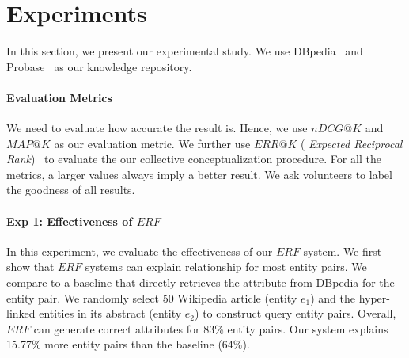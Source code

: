 
\section{Experiments}
\label{sec:exp}

In this section, we present our experimental study.
We use DBpedia~\cite{dbpedia} and Probase~\cite{wu2012probase} as our knowledge repository.
\
\vspace{-4mm}
\paragraph*{Evaluation Metrics}
We need to evaluate how accurate the result is. 
Hence, we use $nDCG@K$ and $MAP@K$ as our evaluation metric.
We further use $ ERR@K$ ( {\it Expected Reciprocal Rank})~\cite{chapelle2009expected} to evaluate the our collective conceptualization procedure.
For all the metrics, a larger values always imply a better result. We ask volunteers to label the goodness of all results.

\vspace{-4mm}
\paragraph*{Exp 1: Effectiveness of $ERF$}
In this experiment, we evaluate the effectiveness of our $ERF$ system.
We first show that $ERF$ systems can explain relationship for most entity pairs.
We compare to a baseline that directly retrieves the attribute from DBpedia for the entity pair.
We randomly select 50 Wikipedia article (entity $e_1$) and the hyper-linked entities in its abstract (entity $e_2$)
to construct query entity pairs.
Overall, $ERF$ can generate correct attributes for 83\% entity pairs.
Our system explains 15.77\% more entity pairs than the baseline (64\%).

